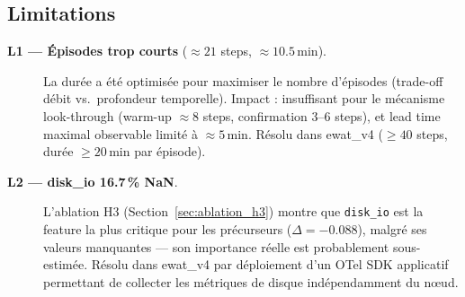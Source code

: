 \subsection{Limitations}
\label{sec:dataset_limitations}

\begin{description}
  \item[\textbf{L1 --- Épisodes trop courts} ($\approx 21$ steps, $\approx 10.5$\,min).]
    La durée a été optimisée pour maximiser le nombre d'épisodes
    (trade-off débit vs.\ profondeur temporelle).
    Impact : insuffisant pour le mécanisme look-through (warm-up $\approx 8$ steps,
    confirmation $3$--$6$ steps), et lead time maximal observable limité à $\approx 5$\,min.
    Résolu dans ewat\_v4 ($\geq 40$ steps, durée $\geq 20$\,min par épisode).

  \item[\textbf{L2 --- disk\_io 16.7\,\% NaN}.]
    L'ablation H3 (Section~\ref{sec:ablation_h3}) montre que \texttt{disk\_io} est
    la feature la plus critique pour les précurseurs ($\Delta = -0.088$),
    malgré ses valeurs manquantes --- son importance réelle est probablement
    sous-estimée. Résolu dans ewat\_v4 par déploiement d'un OTel SDK applicatif
    permettant de collecter les métriques de disque indépendamment du nœud.
\end{description}
